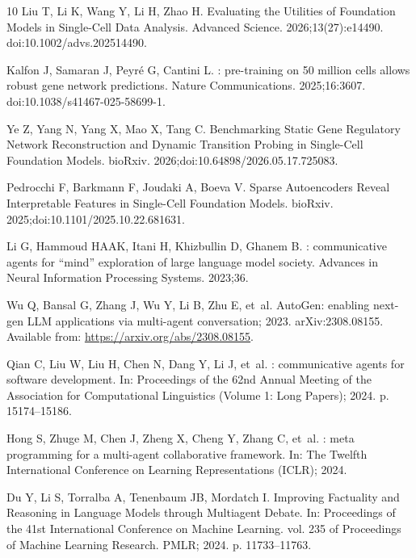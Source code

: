 \documentclass[10pt,letterpaper]{article}
\begin{document}
\begin{thebibliography}{10}
Liu T, Li K, Wang Y, Li H, Zhao H.
\newblock Evaluating the Utilities of Foundation Models in Single-Cell Data
  Analysis.
\newblock Advanced Science. 2026;13(27):e14490.
\newblock doi:{10.1002/advs.202514490}.

Kalfon J, Samaran J, Peyr{\'e} G, Cantini L.
: pre-training on 50 million cells allows robust gene
  network predictions.
\newblock Nature Communications. 2025;16:3607.
\newblock doi:{10.1038/s41467-025-58699-1}.

Ye Z, Yang N, Yang X, Mao X, Tang C.
\newblock Benchmarking Static Gene Regulatory Network Reconstruction and
  Dynamic Transition Probing in Single-Cell Foundation Models.
\newblock bioRxiv. 2026;doi:{10.64898/2026.05.17.725083}.

Pedrocchi F, Barkmann F, Joudaki A, Boeva V.
\newblock Sparse Autoencoders Reveal Interpretable Features in Single-Cell
  Foundation Models.
\newblock bioRxiv. 2025;doi:{10.1101/2025.10.22.681631}.

Li G, Hammoud HAAK, Itani H, Khizbullin D, Ghanem B.
: communicative agents for ``mind'' exploration of large
  language model society.
\newblock Advances in Neural Information Processing Systems. 2023;36.

Wu Q, Bansal G, Zhang J, Wu Y, Li B, Zhu E, et~al. {AutoGen}: enabling
  next-gen {LLM} applications via multi-agent conversation; 2023.
\newblock arXiv:2308.08155.
\newblock Available from: \url{https://arxiv.org/abs/2308.08155}.

Qian C, Liu W, Liu H, Chen N, Dang Y, Li J, et~al.
: communicative agents for software development.
\newblock In: Proceedings of the 62nd Annual Meeting of the Association for
  Computational Linguistics (Volume 1: Long Papers); 2024. p. 15174--15186.

Hong S, Zhuge M, Chen J, Zheng X, Cheng Y, Zhang C, et~al.
: meta programming for a multi-agent collaborative
  framework.
\newblock In: The Twelfth International Conference on Learning Representations
  (ICLR); 2024.

Du Y, Li S, Torralba A, Tenenbaum JB, Mordatch I.
\newblock Improving Factuality and Reasoning in Language Models through
  Multiagent Debate.
\newblock In: Proceedings of the 41st International Conference on Machine
  Learning. vol. 235 of Proceedings of Machine Learning Research. PMLR; 2024.
  p. 11733--11763.


\end{thebibliography}
\end{document}
